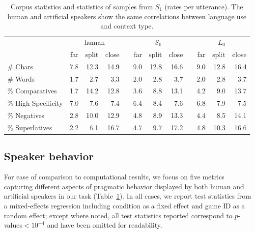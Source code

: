 \documentclass[11pt,letterpaper]{article}
\newcommand{\Listener}{L}
\newcommand{\Speaker}{S}
\renewcommand{\|}{\mid}
\newcommand{\tabref}[1]{Table~\ref{#1}}
\begin{document}
\begin{table}[ht]
\centering
\begin{tabular}{lrrrr@{\hspace{20pt}}rrrr@{\hspace{20pt}}rrr}
  \toprule
  & \multicolumn{3}{c}{human}&& \multicolumn{3}{c}{$\Speaker_0$}&& \multicolumn{3}{c}{$\Listener_0$}\\
  & far& split& close&& far& split& close&& far& split& close\\ \midrule
  \# Chars            & 7.8 & 12.3 & 14.9 && 9.0 & 12.8 & 16.6 && 9.0 & 12.8 & 16.4 \\ 
  \# Words            & 1.7 & 2.7 & 3.3   && 2.0 & 2.8 & 3.7   && 2.0 & 2.8 & 3.7   \\ 
  \% Comparatives     & 1.7 & 14.2 & 12.8 && 3.6 & 8.8 & 13.1  && 4.2 & 9.0 & 13.7  \\ 
  \% High Specificity & 7.0 & 7.6 & 7.4   && 6.4 & 8.4 & 7.6   && 6.8 & 7.9 & 7.5   \\ 
  \% Negatives        & 2.8 & 10.0 & 12.9 && 4.8 & 8.9 & 13.3  && 4.4 & 8.5 & 14.1  \\ 
  \% Superlatives     & 2.2 & 6.1 & 16.7  && 4.7 & 9.7 & 17.2  && 4.8 & 10.3 & 16.6 \\ 
   \bottomrule
\end{tabular}
\caption{Corpus statistics and statistics of samples from $\Speaker_1$
  (rates per utterance). The human and artificial speakers show
  the same correlations between language use and context type.} 
\label{table:metrics}
\end{table}

\subsection{Speaker behavior} \label{sec:speaker_behavior}

For ease of comparison to computational results, we focus on five
metrics capturing different aspects of pragmatic behavior
displayed by both human and artificial speakers in our task
(\tabref{table:metrics}). In all cases, we report test statistics from a mixed-effects regression including condition as a fixed effect and game ID as a random effect; except where noted, all test statistics reported correspond to $p$-values${}<10^{-4}$ and have been omitted for readability.
\end{document}
